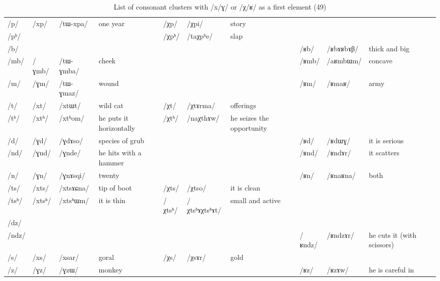 \documentclass[oldfontcommands,oneside,a4paper,11pt]{article}
\newcommand{\ipa}[1]{\mbox{/#1/}} %
\newcommand{\deux}[1]{/#1/}
\newcommand{\tib}[1]{\cellcolor{lightgray}\textbf{#1}}
\newcommand{\idph}[1]{\cellcolor{gray}\textbf{#1}}
\begin{document}
\begin{landscape}
 \begin{longtable}{l|lll|lll|lll|l}
 \caption{List of consonant clusters with  \ipa{x/ɣ} or \ipa{χ/ʁ} as a first element (49)}\\ %
\toprule
\ipa{p}	& 	 \deux{xp}	& 	 \ipa{tɯ-xpa}	& 	one year	&   \deux{χp} \tib{}	& 	 \ipa{χpi}	& 	story	&	&	& \\  		
\ipa{pʰ}	& 	  	& 	  	& 	  	& 	 \deux{χpʰ}	& 	 \ipa{taχpʰe}	& 	slap	&	&	& \\  	
\ipa{b}	& 	  	& 	  	& 	  	& 	  	& 	&	&\deux{ʁb}  \idph{}	& \ipa{ʁbɤʁbɤβ}		&	 thick and big\\  	
\ipa{mb}	& 	 \deux{ɣmb}	& 	 \ipa{tɯ-ɣmba}	& 	cheek	& 	&	&	& 	 \deux{ʁmb}	& 	 \ipa{aʁmbɯm}	& 	 concave\\  	
\ipa{m}	& 	 \deux{ɣm}	& 	 \ipa{tɯ-ɣmaz}	& 	wound	& 	&	&	& 	 \deux{ʁm}	& 	 \ipa{ʁmaʁ}	& 	army \\  	
\ipa{t}	& 	 \deux{xt}	& 	 \ipa{xtɯt}	& 	 wild cat 	& 	 \deux{χt}	& 	 \ipa{χtɤrma}	& 	offerings	&	&	& \\  	
\ipa{tʰ}	& 	 \deux{xtʰ}	& 	 \ipa{xtʰom}	& 	 he puts it horizontally	& 	 \deux{χtʰ}	& 	 \ipa{naχthɤw}	& 	he seizes the opportunity 	&	&	&\\  	
\ipa{d}	& 	 \deux{ɣd}	& 	 \ipa{ɣdɤso}	& 	species of grub	& 	&	&	& 	 \deux{ʁd} \tib{} 	& 	 \ipa{ʁdɯɣ}	& 	it is serious \\  	
\ipa{nd}	& 	 \deux{ɣnd}	& 	 \ipa{ɣnde}	& 	he hits with a hammer	& 	&	&	& 	 \deux{ʁnd}	& 	 \ipa{ʁndɤr}	& 	it scatters \\  	
\ipa{n}	& 	 \deux{ɣn}	& 	 \ipa{ɣnɤsqi}	& 	 twenty 	& 	&	&	& \deux{ʁn}	& 	 	\ipa{ʁnaʁna}	& 	both \\  	
\ipa{ts}	& 	 \deux{xts}	& 	 \ipa{xtsɤɕna}	& 	 tip of boot 	& 	 \deux{χts}	& 	 \ipa{χtso}	& 	it is clean	&	&	& \\  	
\ipa{tsʰ}	& 	 \deux{xtsʰ}	& 	 \ipa{xtsʰɯm}	& 	 it is thin 	& 	 \deux{χtsʰ} \idph{}	& 	 \ipa{χtsʰɤχtsʰɤt}	& 	 small and active	&	&	&\\  	
\ipa{dz} 	& 	  	& 	  	& 	  	& 	  	& 	  	& 	& 	  	& 	  	& 	 \\  
\ipa{ndz}	& 	  	& 	  	& 	  	& 	&	&	&	 \deux{ʁndz}	& 	 \ipa{ʁndzɤr}	& 	he cuts it (with scissors) \\  	
\ipa{s}	& 	 \deux{xs}	& 	 \ipa{xsar}	& 	 goral 	& 	 \deux{χs}	& 	 \ipa{χsɤr}	& 	gold 	&	&	&\\  	
\ipa{z}	& 	 \deux{ɣz}	& 	 \ipa{ɣzɯ}	& 	 monkey 	& 	&	&	& \deux{ʁz}  \tib{}	&   \deux{ʁzɤw} 	& 	he is careful in \\  		

\end{longtable}
\end{landscape}
\end{document}
